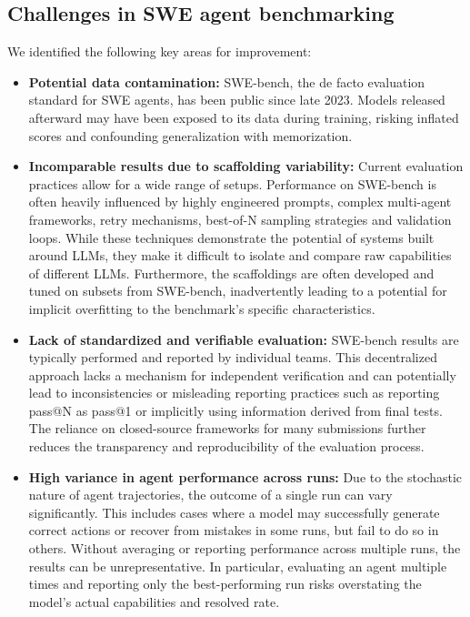 \documentclass[dandb]{article}
\begin{document}
\subsection{Challenges in SWE agent benchmarking}

We identified the following key areas for improvement:

\begin{itemize}
    \item \textbf{Potential data contamination:} SWE-bench, the de facto evaluation standard for SWE agents, has been public since late 2023. Models released afterward may have been exposed to its data during training, risking inflated scores and confounding generalization with memorization.
    \item \textbf{Incomparable results due to scaffolding variability:} Current evaluation practices allow for a wide range of setups. Performance on SWE-bench is often heavily influenced by highly engineered prompts, complex multi-agent frameworks, retry mechanisms, best-of-N sampling strategies and validation loops. While these techniques demonstrate the potential of systems built around LLMs, they make it difficult to isolate and compare raw capabilities of different LLMs. Furthermore, the scaffoldings are often developed and tuned on subsets from SWE-bench, inadvertently leading to a potential for implicit overfitting to the benchmark’s specific characteristics.
    \item \textbf{Lack of standardized and verifiable evaluation:} SWE-bench results are typically performed and reported by individual teams. This decentralized approach lacks a mechanism for independent verification and can potentially lead to inconsistencies or misleading reporting practices such as reporting pass@N as pass@1 or implicitly using information derived from final tests. The reliance on closed-source frameworks for many submissions further reduces the transparency and reproducibility of the evaluation process.
    \item \textbf{High variance in agent performance across runs:} Due to the stochastic nature of agent trajectories, the outcome of a single run can vary significantly. This includes cases where a model may successfully generate correct actions or recover from mistakes in some runs, but fail to do so in others. Without averaging or reporting performance across multiple runs, the results can be unrepresentative. In particular, evaluating an agent multiple times and reporting only the best-performing run risks overstating the model’s actual capabilities and resolved rate.
\end{itemize}
\end{document}
